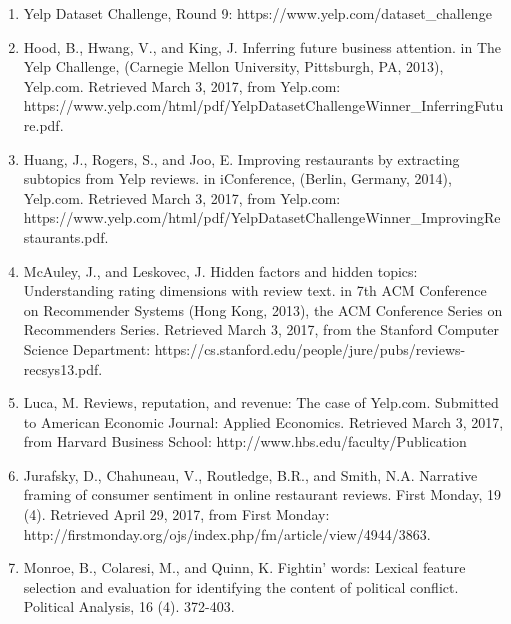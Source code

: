 \begin{enumerate}
	\item Yelp Dataset Challenge, Round 9: https://www.yelp.com/dataset_challenge

	\item Hood, B., Hwang, V., and King, J. Inferring future business attention. in The Yelp Challenge, (Carnegie Mellon University, Pittsburgh, PA, 2013), Yelp.com. Retrieved March 3, 2017, from Yelp.com: https://www.yelp.com/html/pdf/YelpDatasetChallengeWinner_InferringFuture.pdf.

    \item Huang, J., Rogers, S., and Joo, E. Improving restaurants by extracting subtopics from Yelp reviews. in iConference, (Berlin, Germany, 2014), Yelp.com. Retrieved March 3, 2017, from Yelp.com: https://www.yelp.com/html/pdf/YelpDatasetChallengeWinner_ImprovingRestaurants.pdf.

    \item McAuley, J., and Leskovec, J. Hidden factors and hidden topics: Understanding rating dimensions with review text. in 7th ACM Conference on Recommender Systems (Hong Kong, 2013), the ACM Conference Series on Recommenders Series. Retrieved March 3, 2017, from the Stanford Computer Science Department: https://cs.stanford.edu/people/jure/pubs/reviews-recsys13.pdf.

    \item Luca, M. Reviews, reputation, and revenue: The case of Yelp.com. Submitted to American Economic Journal: Applied Economics. Retrieved March 3, 2017, from Harvard Business School: http://www.hbs.edu/faculty/Publication%

    \item Jurafsky, D., Chahuneau, V., Routledge, B.R., and Smith, N.A. Narrative framing of consumer sentiment in online restaurant reviews. First Monday, 19 (4). Retrieved April 29, 2017, from First Monday: http://firstmonday.org/ojs/index.php/fm/article/view/4944/3863.

    \item Monroe, B., Colaresi, M., and Quinn, K. Fightin’ words: Lexical feature selection and evaluation for identifying the content of political conflict. Political Analysis, 16 (4). 372-403.

\end{enumerate}



